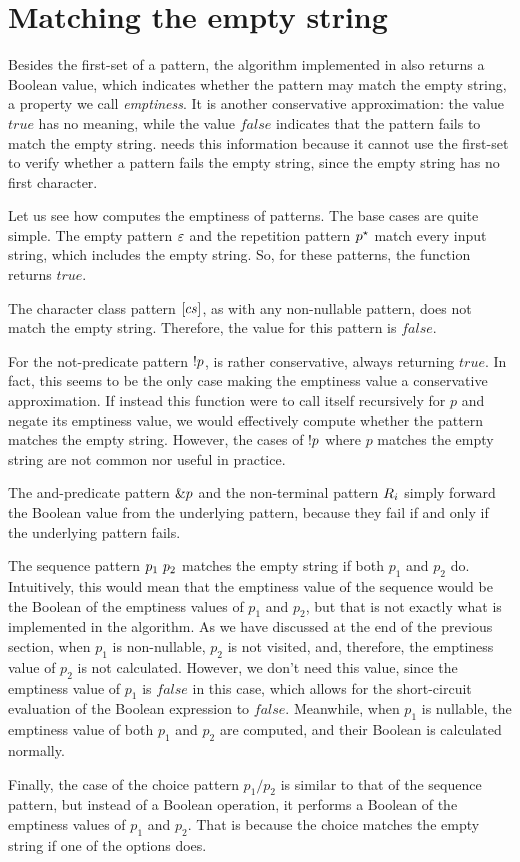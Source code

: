 \section{Matching the empty string}

Besides the first-set of a pattern,
the algorithm implemented in \lpeg{} also returns
a Boolean value, which indicates whether the
pattern may match the empty string,
a property we call \emph{emptiness}.
It is another conservative approximation:
the value $true$ has no meaning,
while the value $false$ indicates that the pattern
fails to match the empty string.
\lpeg{} needs this information
because it cannot use the first-set
to verify whether a pattern fails the empty string,
since the empty string has no first character.

Let us see how \lpeg{} computes
the emptiness of patterns.
The base cases are quite simple.
The empty pattern $\varepsilon$ and
the repetition pattern $p^\star$
match every input string,
which includes the empty string.
So, for these patterns,
the function returns $true$.

The character class pattern $[cs]$,
as with any non-nullable pattern,
does not match the empty string.
Therefore, the value for this pattern is $false$.

For the not-predicate pattern $!p$,
\lpeg{} is rather conservative,
always returning $true$.
In fact, this seems to be
the only case making the emptiness value
a conservative approximation.
If instead this function were to call itself
recursively for $p$ and negate its emptiness value,
we would effectively compute whether
the pattern matches the empty string.
However, the cases of $!p$
where $p$ matches the empty string
are not common nor useful in practice.

The and-predicate pattern $\&p$
and the non-terminal pattern $R_{i}$
simply forward the Boolean value
from the underlying pattern,
because they fail if and only if
the underlying pattern fails.

The sequence pattern $p_1\ p_2$
matches the empty string if
both $p_1$ and $p_2$ do.
Intuitively, this would mean that the emptiness value of the sequence
would be the Boolean \scand{} of the emptiness values of $p_1$ and $p_2$,
but that is not exactly what is implemented in the algorithm.
As we have discussed at the end of the previous section,
when $p_1$ is non-nullable, $p_2$ is not visited,
and, therefore, the emptiness value of $p_2$ is not calculated.
However, we don't need this value,
since the emptiness value of $p_1$ is $false$ in this case,
which allows for the short-circuit evaluation
of the Boolean \scand{} expression to $false$.
Meanwhile, when $p_1$ is nullable,
the emptiness value of both $p_1$ and $p_2$ are computed,
and their Boolean \scand{} is calculated normally.

Finally, the case of the choice pattern $p_1/p_2$
is similar to that of the sequence pattern,
but instead of a Boolean \scand{} operation,
it performs a Boolean \scor{}
of the emptiness values of $p_1$ and $p_2$.
That is because the choice matches the empty string
if one of the options does.

